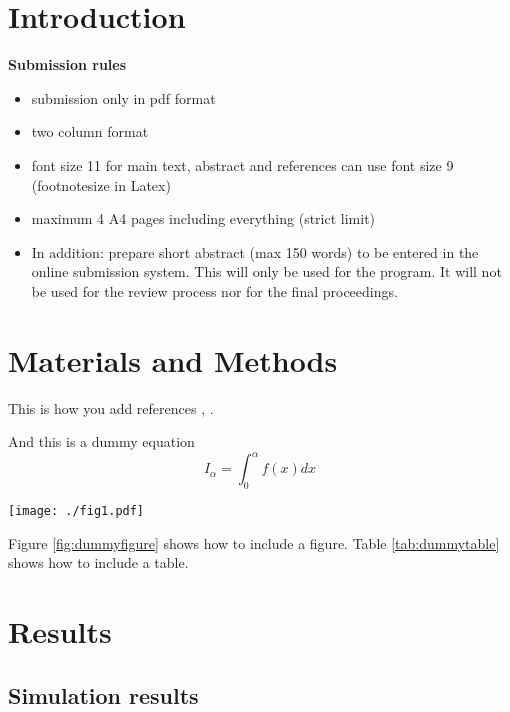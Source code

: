 \section{Introduction}

\textbf{\color{red}Submission rules}
\begin{itemize}
\color{red}
\item submission only in pdf format
\item two column format
\item font size 11 for main text, abstract and references can use font size 9 (footnotesize in Latex)
\item maximum 4 A4 pages including everything (strict limit)
\item In addition: prepare short abstract (max 150 words) to be entered in the online submission system. 
      This will only be used for the program. 
      It will not be used for the review process nor for the final proceedings.
\end{itemize}

\lipsum[2-5]


\section{Materials and Methods}

This is how you add references \cite{Doe2020}, \cite{Deen2019}.

And this is a dummy equation
\begin{equation}
I_\alpha = \int_0^\alpha f(x) dx
\end{equation}

\begin{figure*}
  \centering
  \texttt{[image: ./fig1.pdf]}
  \caption{This a dummy figure to be replaced.}
  \label{fig:dummyfigure}
\end{figure*}

Figure \ref{fig:dummyfigure} shows how to include a figure.
Table \ref{tab:dummytable} shows how to include a table.

\bigskip

\lipsum[2-7]

\section{Results}
\subsection{Simulation results}

